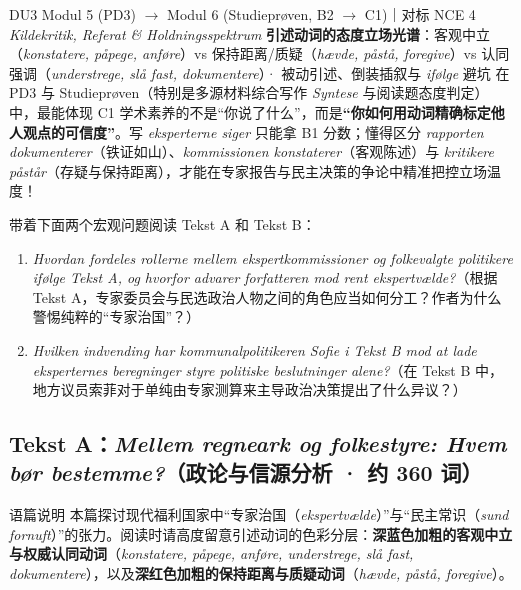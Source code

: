 {DU3 Modul 5 (PD3) $\rightarrow$ Modul 6 (Studieprøven, B2 $\rightarrow$ C1)｜对标 NCE 4 \textit{Kildekritik, Referat \& Holdningsspektrum}}
{\textbf{引述动词的态度立场光谱}：客观中立（\textit{konstatere, påpege, anføre}）vs 保持距离/质疑（\textit{hævde, påstå, foregive}）vs 认同强调（\textit{understrege, slå fast, dokumentere}）· 被动引述、倒装插叙与 \textit{ifølge} 避坑}
{在 PD3 与 Studieprøven（特别是多源材料综合写作 \textit{Syntese} 与阅读题态度判定）中，最能体现 C1 学术素养的不是“你说了什么”，而是\textbf{“你如何用动词精确标定他人观点的可信度”}。写 \textit{eksperterne siger} 只能拿 B1 分数；懂得区分 \textit{rapporten dokumenterer}（铁证如山）、\textit{kommissionen konstaterer}（客观陈述）与 \textit{kritikere påstår}（存疑与保持距离），才能在专家报告与民主决策的争论中精准把控立场温度！}

\begin{foerduleaeser}
带着下面两个宏观问题阅读 Tekst A 和 Tekst B：
\begin{enumerate}
  \item \textit{Hvordan fordeles rollerne mellem ekspertkommissioner og folkevalgte politikere ifølge Tekst A, og hvorfor advarer forfatteren mod rent ekspertvælde?}（根据 Tekst A，专家委员会与民选政治人物之间的角色应当如何分工？作者为什么警惕纯粹的“专家治国”？）
  \item \textit{Hvilken indvending har kommunalpolitikeren Sofie i Tekst B mod at lade eksperternes beregninger styre politiske beslutninger alene?}（在 Tekst B 中，地方议员索菲对于单纯由专家测算来主导政治决策提出了什么异议？）
\end{enumerate}
\end{foerduleaeser}


\subsection*{Tekst A：\textit{Mellem regneark og folkestyre: Hvem bør bestemme?}（政论与信源分析 · 约 360 词）}

\begin{tipbox}{语篇说明}
本篇探讨现代福利国家中“专家治国（\textit{ekspertvælde}）”与“民主常识（\textit{sund fornuft}）”的张力。阅读时请高度留意引述动词的色彩分层：\textbf{\color{NCDNavy}深蓝色加粗的客观中立与权威认同动词}（\textit{konstatere, påpege, anføre, understrege, slå fast, dokumentere}），以及\textbf{\color{NCDRed}深红色加粗的保持距离与质疑动词}（\textit{hævde, påstå, foregive}）。
\end{tipbox}

